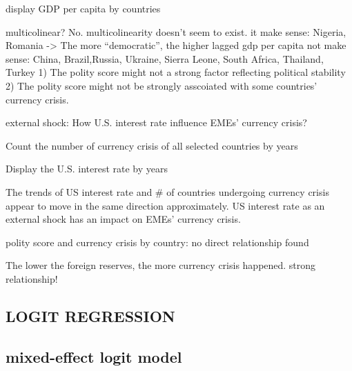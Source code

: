 \documentclass[12pt,]{article}
\begin{document}
display GDP per capita by countries

multicolinear? No. multicolinearity doesn't seem to exist. it make
sense: Nigeria, Romania -\textgreater{} The more ``democratic'', the
higher lagged gdp per capita not make sense: China, Brazil,Russia,
Ukraine, Sierra Leone, South Africa, Thailand, Turkey 1) The polity
score might not a strong factor reflecting political stability 2) The
polity score might not be strongly asscoiated with some countries'
currency crisis.

external shock: How U.S. interest rate influence EMEs' currency crisis?

Count the number of currency crisis of all selected countries by years

Display the U.S. interest rate by years

The trends of US interest rate and \# of countries undergoing currency
crisis appear to move in the same direction approximately. US interest
rate as an external shock has an impact on EMEs' currency crisis.

polity score and currency crisis by country: no direct relationship
found

The lower the foreign reserves, the more currency crisis happened.
strong relationship!

\subsection{LOGIT REGRESSION}\label{logit-regression}

\subsection{mixed-effect logit model}\label{mixed-effect-logit-model-1}
\end{document}
